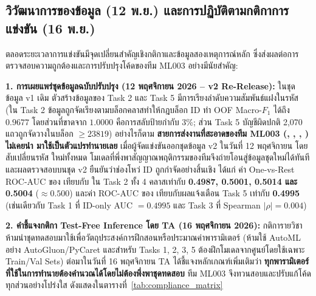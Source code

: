 \subsection{วิวัฒนาการของข้อมูล (12 พ.ย.) และการปฏิบัติตามกติกาการแข่งขัน (16 พ.ย.)}
\label{subsec:evolution_compliance}

ตลอดระยะเวลาการแข่งขันมีจุดเปลี่ยนสำคัญเชิงกติกาและข้อมูลสองเหตุการณ์หลัก ซึ่งส่งผลต่อการตรวจสอบความถูกต้องและการปรับปรุงโค้ดของทีม ML003 อย่างมีนัยสำคัญ:

\textbf{1. การเผยแพร่ชุดข้อมูลฉบับปรับปรุง (12 พฤศจิกายน 2026 -- v2 Re-Release):}
ในชุดข้อมูล v1 เดิม ตัวสร้างข้อมูลของ Task 2 และ Task 5 มีการเรียงลำดับความสัมพันธ์แฝงในรหัส  (ใน Task 2 ข้อมูลถูกจัดเรียงตามบล็อกคลาสทำให้กฎบล็อก ID ทำ OOF Macro-$F_1$ ได้ถึง $0.9677$ โดยส่วนที่ขาดจาก $1.0000$ คือการสลับป้ายกำกับ 3\%; ส่วน Task 5 บัญชีผิดปกติ 2,070 แถวถูกจัดวางในบล็อก  $\ge 23819$) อย่างไรก็ตาม \textbf{สายการส่งงานที่สะอาดของทีม ML003 (, , , ) ไม่เคยนำ  มาใช้เป็นตัวแปรทำนายเลย} เมื่อผู้จัดแข่งขันออกชุดข้อมูล v2 ในวันที่ 12 พฤศจิกายน โดยสับเปลี่ยนรหัส  ใหม่ทั้งหมด โมเดลที่พึ่งพาสัญญาณพฤติกรรมของทีมจึงถ่ายโอนสู่ข้อมูลชุดใหม่ได้ทันที และผลตรวจสอบบนชุด v2 ยืนยันว่าช่องโหว่ ID ถูกกำจัดอย่างสิ้นเชิง ได้แก่ ค่า One-vs-Rest ROC-AUC ของ  เทียบกับ  ใน Task 2 ทั้ง 4 คลาสเท่ากับ \textbf{0.4987, 0.5001, 0.5014 และ 0.5004} ($\approx 0.500$) และค่า ROC-AUC ของ  เทียบกับผลแจ้งเตือน Task 5 เท่ากับ \textbf{0.4995} (เช่นเดียวกับ Task 1 ที่ ID-only AUC $= 0.4995$ และ Task 3 ที่ Spearman $|\rho| = 0.004$)

\textbf{2. คำชี้แจงกติกา Test-Free Inference โดย TA (16 พฤศจิกายน 2026):}
กติการายวิชาห้ามนำชุดทดสอบมาใช้เพื่อวัตถุประสงค์การฝึกสอนหรือประมาณค่าพารามิเตอร์ (ห้ามใช้ AutoML อย่าง AutoGluon/PyCaret และสำหรับ Tasks 1, 2, 3, 5 ต้องฝึกโมเดลจากศูนย์โดยใช้เฉพาะ Train/Val Sets) ต่อมาในวันที่ 16 พฤศจิกายน TA ได้ชี้แจงหลักเกณฑ์เพิ่มเติมว่า \textbf{ทุกพารามิเตอร์ที่ใช้ในการทำนายต้องคำนวณได้โดยไม่ต้องพึ่งพาชุดทดสอบ} ทีม ML003 จึงทวนสอบและปรับแก้โค้ดทุกส่วนอย่างโปร่งใส ดังแสดงในตารางที่~\ref{tab:compliance_matrix}

